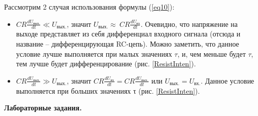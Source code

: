 \documentclass[14pt,a4paper]{article}
\begin{document}
Рассмотрим 2 случая использования формулы (\ref{eq10}):
\begin{itemize}
\item
  \(CR\frac{dU_\text{вых.}}{dt} \ll U_\text{вых.}\), значит
  \(U_\text{вых.} \approx \ CR\frac{{dU}_\text{вх}}{dt}\). Очевидно, что напряжение
  на выходе представляет из себя дифференциал входного сигнала (отсюда и
  название -- дифференцирующая RC-цепь). Можно заметить, что данное
  условие лучше выполняется при малых значениях \(\tau\), и, чем меньше
  будет $\tau$, тем лучше будет дифференцирование (рис. \ref{ResistInten}).
\item \(CR\frac{dU_\text{вых.}}{dt} \gg U_\text{вых.}\), значит
  \(CR\frac{{dU}_\text{вх}}{dt} = CR\frac{dU_\text{вых.}}{dt}\) или \(U_\text{вых.} = U_\text{вх.}\). Данное условие выполняется при больших значениях
  τ (рис. \ref{ResistInten}).
\end{itemize}

\textbf{Лабораторные задания.}
\end{document}
